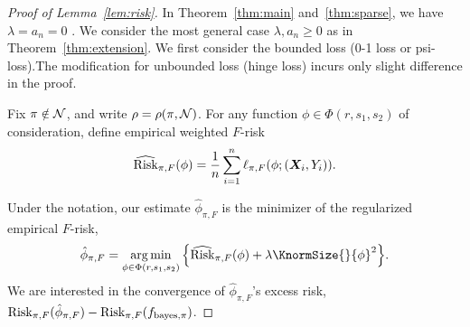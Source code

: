 \documentclass[11pt]{article}
\theoremstyle{plain}
\theoremstyle{definition}
\def\bayespif{f_{\textup{bayes},\pi}}
\def\riskF{\textup{Risk}_{\pi,F}}
\def\eriskF{\widehat{\textup{Risk}}_{\pi,F}}
\begin{document}
\begin{proof}[Proof of Lemma~\ref{lem:risk}]
 In Theorem~\ref{thm:main} and~\ref{thm:sparse}, we have  $\lambda = a_n = 0$ . We consider the  most general case $\lambda,a_n\geq 0$  as in Theorem~\ref{thm:extension}.
We first consider the bounded loss (0-1 loss or psi-loss).The modification for unbounded loss (hinge loss) incurs only slight difference in the proof. 

Fix $\pi\notin\mathcal{N}$, and write $\rho=\rho(\pi,\mathcal{N})$. For any function $\phi\in\Phi(r,s_1,s_2)$ of consideration, define empirical weighted $F$-risk
\begin{equation}\label{eq:F}
\eriskF(\phi)	= \frac{1}{n}\sum_{i=1}^n\ell_{\pi,F}(\phi; (\mX_i,Y_i)).
\end{equation}

Under the notation, our estimate $\hat \phi_{\pi,F}$ is the minimizer of the regularized empirical $F$-risk,
\begin{equation}\label{eq:def2}
\hat \phi_{\pi,F}=\argmin_{\phi\in\Phi(r,s_1,s_2)}\Big\{ \eriskF(\phi)+\lambda\KnormSize{}{\phi}^2\Big\}.
\end{equation}
We are interested in the convergence of $\hat \phi_{\pi,F}$'s  excess risk, $\riskF(\hat\phi_{\pi,F})-\riskF(\bayespif)$. 


\end{proof}
\end{document}
